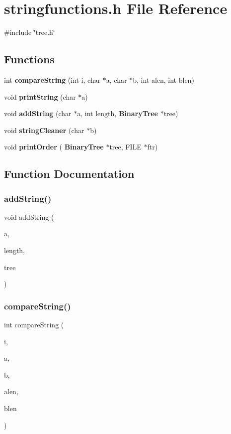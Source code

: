 \section{stringfunctions.\+h File Reference}
\label{stringfunctions_8h}
{\ttfamily \#include \char`\"{}tree.\+h\char`\"{}}\newline
\subsection*{Functions}
\begin{DoxyCompactItemize}
\item 
int \textbf{ compare\+String} (int i, char $\ast$a, char $\ast$b, int alen, int blen)
\item 
void \textbf{ print\+String} (char $\ast$a)
\item 
void \textbf{ add\+String} (char $\ast$a, int length, \textbf{ Binary\+Tree} $\ast$tree)
\item 
void \textbf{ string\+Cleaner} (char $\ast$b)
\item 
void \textbf{ print\+Order} (\textbf{ Binary\+Tree} $\ast$tree, F\+I\+LE $\ast$ftr)
\end{DoxyCompactItemize}


\subsection{Function Documentation}
\mbox{\label{stringfunctions_8h_ad193cac7db9b73522d7f18d775cf6219}} 
\subsubsection{add\+String()}
{\footnotesize\ttfamily void add\+String (\begin{DoxyParamCaption}\item[{char $\ast$}]{a,  }\item[{int}]{length,  }\item[{\textbf{ Binary\+Tree} $\ast$}]{tree }\end{DoxyParamCaption})}

\mbox{\label{stringfunctions_8h_ad7bf079bacd4ef94c68cfaf02477fad4}} 
\subsubsection{compare\+String()}
{\footnotesize\ttfamily int compare\+String (\begin{DoxyParamCaption}\item[{int}]{i,  }\item[{char $\ast$}]{a,  }\item[{char $\ast$}]{b,  }\item[{int}]{alen,  }\item[{int}]{blen }\end{DoxyParamCaption})}

